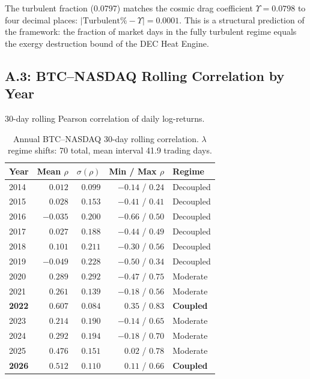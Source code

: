 The turbulent fraction (0.0797) matches the cosmic drag coefficient $\Upsilon = 0.0798$ to four decimal places: $|\text{Turbulent\%} - \Upsilon| = 0.0001$. This is a structural prediction of the framework: the fraction of market days in the fully turbulent regime equals the exergy destruction bound of the DEC Heat Engine.

\subsection*{A.3: BTC--NASDAQ Rolling Correlation by Year}

30-day rolling Pearson correlation of daily log-returns.

\begin{table}[ht]
\centering\small
\caption{Annual BTC--NASDAQ 30-day rolling correlation. $\lambda$ regime shifts: 70 total, mean interval 41.9 trading days.}
\label{tab:btc_ndx_corr}
\begin{tabular}{@{}lrrrl@{}}
\toprule
\textbf{Year} & \textbf{Mean $\rho$} & \textbf{$\sigma(\rho)$} & \textbf{Min / Max $\rho$} & \textbf{Regime} \\
\midrule
2014 & $0.012$ & $0.099$ & $-0.14$ / $0.24$ & Decoupled \\
2015 & $0.028$ & $0.153$ & $-0.41$ / $0.41$ & Decoupled \\
2016 & $-0.035$ & $0.200$ & $-0.66$ / $0.50$ & Decoupled \\
2017 & $0.027$ & $0.188$ & $-0.44$ / $0.49$ & Decoupled \\
2018 & $0.101$ & $0.211$ & $-0.30$ / $0.56$ & Decoupled \\
2019 & $-0.049$ & $0.228$ & $-0.50$ / $0.34$ & Decoupled \\
2020 & $0.289$ & $0.292$ & $-0.47$ / $0.75$ & Moderate \\
2021 & $0.261$ & $0.139$ & $-0.18$ / $0.56$ & Moderate \\
\textbf{2022} & $\mathbf{0.607}$ & $\mathbf{0.084}$ & $0.35$ / $0.83$ & \textbf{Coupled} \\
2023 & $0.214$ & $0.190$ & $-0.14$ / $0.65$ & Moderate \\
2024 & $0.292$ & $0.194$ & $-0.18$ / $0.70$ & Moderate \\
2025 & $0.476$ & $0.151$ & $0.02$ / $0.78$ & Moderate \\
\textbf{2026} & $\mathbf{0.512}$ & $\mathbf{0.110}$ & $0.11$ / $0.66$ & \textbf{Coupled} \\
\bottomrule
\end{tabular}
\end{table}

